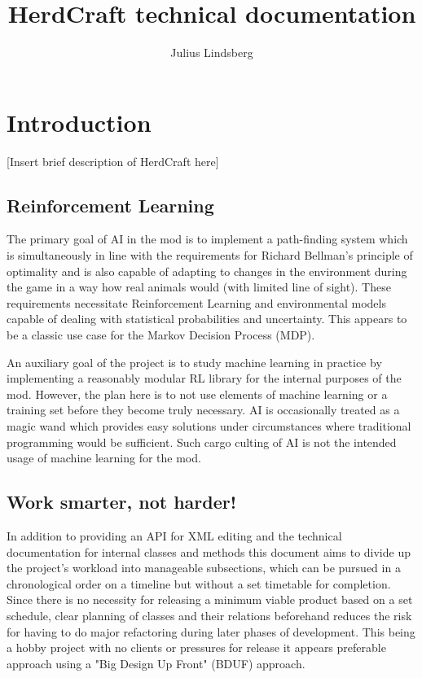 \documentclass[]{article}
\title{HerdCraft technical documentation}
\author{Julius Lindsberg}
\begin{document}
\maketitle
\tableofcontents
\newpage

\section{Introduction}

[Insert brief description of HerdCraft here]

\subsection{Reinforcement Learning}

The primary goal of AI in the mod is to implement a path-finding system which is simultaneously in line with the requirements for Richard Bellman's principle of optimality and is also capable of adapting to changes in the environment during the game in a way how real animals would (with limited line of sight). These requirements necessitate Reinforcement Learning and environmental models capable of dealing with statistical probabilities and uncertainty. This appears to be a classic use case for the Markov Decision Process (MDP).

An auxiliary goal of the project is to study machine learning in practice by implementing a reasonably modular RL library for the internal purposes of the mod. However, the plan here is to not use elements of machine learning or a training set before they become truly necessary. AI is occasionally treated as a magic wand which provides easy solutions under circumstances where traditional programming would be sufficient. Such cargo culting of AI is not the intended usage of machine learning for the mod.

\subsection{Work smarter, not harder!}

In addition to providing an API for XML editing and the technical documentation for internal classes and methods this document aims to divide up the project's workload into manageable subsections, which can be pursued in a chronological order on a timeline but without a set timetable for completion. Since there is no necessity for releasing a minimum viable product based on a set schedule, clear planning of classes and their relations beforehand reduces the risk for having to do major refactoring during later phases of development. This being a hobby project with no clients or pressures for release it appears preferable approach using a "Big Design Up Front" (BDUF) approach.
\end{document}
